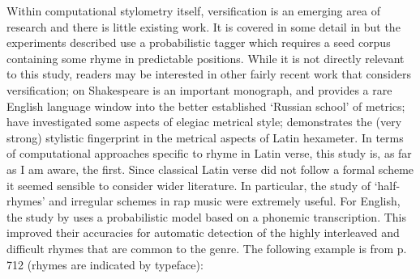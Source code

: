 \documentclass[twocolumn, switch]{article} %
\begin{document}
Within computational stylometry itself, versification is an emerging area of
research and there is little existing work. It is covered in some detail in
 but the experiments described use a
probabilistic tagger which requires a seed corpus containing some rhyme in
predictable positions. While it is not directly relevant to this study,
readers may be interested in other fairly recent work that considers
versification;  on Shakespeare is
an important monograph, and provides a rare English language window into the
better established  `Russian school' of metrics;
 have investigated some aspects of elegiac
metrical style;  demonstrates the (very strong)
stylistic fingerprint in the metrical aspects of Latin hexameter. In terms of
computational approaches specific to rhyme in Latin verse, this study is, as
far as I am aware, the first. Since classical Latin verse did not follow a
formal scheme it seemed sensible to consider wider literature. In particular,
the study of `half-rhymes' and irregular schemes in rap music were extremely
useful. For English, the study by  uses a
probabilistic model based on a phonemic transcription. This improved their
accuracies for automatic detection of the highly interleaved and difficult
rhymes that are common to the genre. The following example is from p. 712
(rhymes are indicated by typeface):
\end{document}
